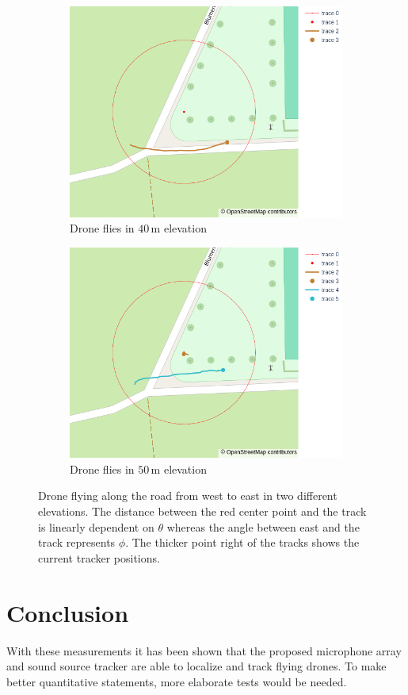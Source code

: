 \begin{figure}[h]
	\centering
	\begin{subfigure}[t]{0.45\textwidth}
		\centering
		\includegraphics[width=\textwidth]{images/7_measurements/we_low.png}
		\caption{Drone flies in $40$\,m elevation}
		\label{meas:fig:west east low}
	\end{subfigure}
	\hfill
	\begin{subfigure}[t]{0.45\textwidth}
		\centering
		\includegraphics[width=\textwidth]{images/7_measurements/we_high.png}
		\caption{Drone flies in $50$\,m elevation}
		\label{meas:fig:west east high}
	\end{subfigure}
	\caption{Drone flying along the road from west to east in two different
		elevations.
		The distance between the red center point and the track is linearly
		dependent on $\theta$ whereas the angle between east and the track represents $\phi$.
		The thicker point right of the tracks shows the current tracker positions.}
	\label{meas:fig:west east}
\end{figure}

\section{Conclusion}
With these measurements it has been shown that the proposed microphone
array and sound source tracker are able
to localize and track flying drones.
To make better quantitative statements, more elaborate tests
would be needed.